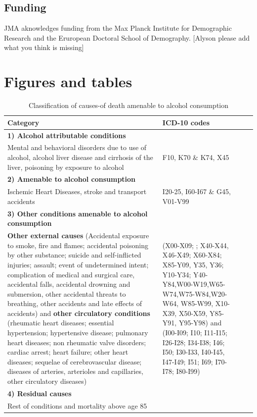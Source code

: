 \documentclass{article}
\begin{document}
\begin{spacing}{1.5}
\section*{Funding}
JMA aknowledges funding from the Max Planck Institute for Demographic Research and the Eruropean Doctoral School of Demography. [Alyson please add what you think is missing]

\end{spacing}

\newpage

 

\newpage

\section*{Figures and tables}

\begin{table}[h!]
\caption{Classification of causes-of death amenable to alcohol consumption}
\label{T1}
\begin{center}
 \begin{tabular}{p{10cm}p{6cm}cc}
\hline 
\textbf{Category} & \textbf{ICD-10 codes} \\ 
\hline 
\textbf{1) Alcohol attributable conditions} & \\
Mental and behavioral disorders due to use of alcohol, alcohol liver disease and cirrhosis of the liver, poisoning by exposure to alcohol&F10, K70 \& K74, X45\\
\hline 
\textbf{2) Amenable to alcohol consumption} & \\
Ischemic Heart Diseases, stroke and transport accidents & I20-25, I60-I67 \& G45, V01-V99\\
\hline 
\textbf{3) Other conditions amenable to alcohol consumption} & \\
\textbf{Other external causes} (Accidental exposure to smoke, fire and flames; accidental poisoning by other substance; suicide and self-inflicted injuries; assault; event of undetermined intent; complication of medical and surgical care, accidental falls, accidental drowning and submersion, other accidental threats to breathing, other accidents and late effects of accidents) and \textbf{other circulatory conditions} (rheumatic heart diseases; essential hypertension; hypertensive disease; pulmonary heart diseases; non rheumatic valve disorders; cardiac arrest; heart failure; other heart diseases; sequelae of cerebrovascular disease; diseases of arteries, arterioles and capillaries, other circulatory diseases)  &  (X00-X09; ; X40-X44, X46-X49; X60-X84; X85-Y09, Y35, Y36; Y10-Y34; Y40-Y84,W00-W19,W65-W74,W75-W84,W20-W64, W85-W99, X10-X39, X50-X59, Y85-Y91, Y95-Y98) and (I00-I09; I10; I11-I15; I26-I28; I34-I38; I46; I50; I30-I33, I40-I45, I47-I49; I51; I69; I70-I78; I80-I99)\\
\hline 
\textbf{4) Residual causes} & \\
Rest of conditions and mortality above age 85  &\\
\hline 
\end{tabular} 
\end{center}
\end{table}
\end{document}
